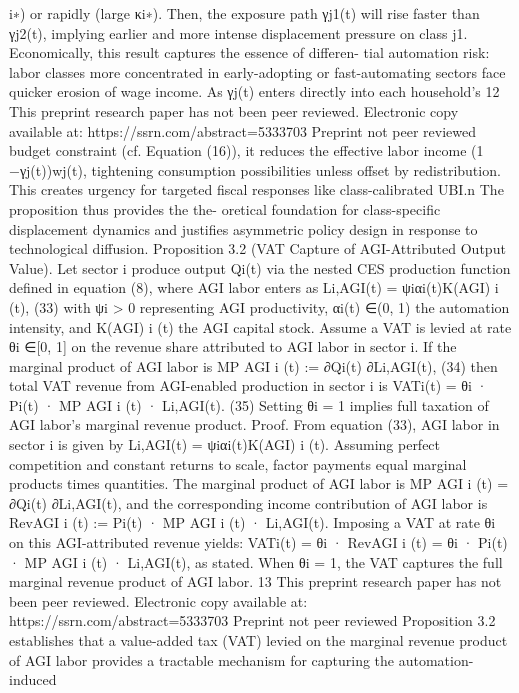 i∗) or rapidly (large κi∗).
Then, the exposure path γj1(t) will rise faster than γj2(t), implying earlier and more intense
displacement pressure on class j1. Economically, this result captures the essence of differen-
tial automation risk: labor classes more concentrated in early-adopting or fast-automating
sectors face quicker erosion of wage income. As γj(t) enters directly into each household’s
12
This preprint research paper has not been peer reviewed. Electronic copy available at: https://ssrn.com/abstract=5333703
Preprint not peer reviewed
budget constraint (cf. Equation (16)), it reduces the effective labor income (1 −γj(t))wj(t),
tightening consumption possibilities unless offset by redistribution. This creates urgency for
targeted fiscal responses like class-calibrated UBI.n The proposition thus provides the the-
oretical foundation for class-specific displacement dynamics and justifies asymmetric policy
design in response to technological diffusion.
Proposition 3.2 (VAT Capture of AGI-Attributed Output Value). Let sector i produce
output Qi(t) via the nested CES production function defined in equation (8), where AGI
labor enters as
Li,AGI(t) = ψiαi(t)K(AGI)
i
(t),
(33)
with ψi > 0 representing AGI productivity, αi(t) ∈(0, 1) the automation intensity, and
K(AGI)
i
(t) the AGI capital stock.
Assume a VAT is levied at rate θi ∈[0, 1] on the revenue share attributed to AGI labor
in sector i. If the marginal product of AGI labor is
MP AGI
i
(t) :=
∂Qi(t)
∂Li,AGI(t),
(34)
then total VAT revenue from AGI-enabled production in sector i is
VATi(t) = θi · Pi(t) · MP AGI
i
(t) · Li,AGI(t).
(35)
Setting θi = 1 implies full taxation of AGI labor’s marginal revenue product.
Proof. From equation (33), AGI labor in sector i is given by
Li,AGI(t) = ψiαi(t)K(AGI)
i
(t).
Assuming perfect competition and constant returns to scale, factor payments equal marginal
products times quantities. The marginal product of AGI labor is
MP AGI
i
(t) =
∂Qi(t)
∂Li,AGI(t),
and the corresponding income contribution of AGI labor is
RevAGI
i
(t) := Pi(t) · MP AGI
i
(t) · Li,AGI(t).
Imposing a VAT at rate θi on this AGI-attributed revenue yields:
VATi(t) = θi · RevAGI
i
(t) = θi · Pi(t) · MP AGI
i
(t) · Li,AGI(t),
as stated.
When θi = 1, the VAT captures the full marginal revenue product of AGI
labor.
13
This preprint research paper has not been peer reviewed. Electronic copy available at: https://ssrn.com/abstract=5333703
Preprint not peer reviewed
Proposition 3.2 establishes that a value-added tax (VAT) levied on the marginal revenue
product of AGI labor provides a tractable mechanism for capturing the automation-induced
